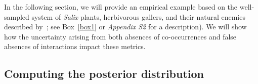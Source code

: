 \documentclass[12pt]{article}
\begin{document}
\begin{spacing}{2.0}
    In the following section, we will provide an empirical example based on the well-sampled system of \emph{Salix}  plants, herbivorous gallers, and their natural enemies described by~\citet{Kopelke2017}; see Box~\ref{box1} or \emph{Appendix S2} for a description). 
    We will show how the uncertainty arising from both absences of co-occurrences and false absences of interactions impact these metrics. %


  \subsection*{Computing the posterior distribution}


\end{spacing}
\end{document}
